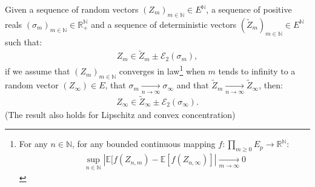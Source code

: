 \documentclass{ws-rmta}
\begin{document}
\begin{lemma}
  Given a sequence of random vectors $(Z_{m})_{m \in \mathbb N} \in E^{\mathbb N}$, a sequence of positive reals $(\sigma_{m})_{m \in \mathbb N} \in \mathbb R^{\mathbb N}_+$ and a sequence of deterministic vectors $(\tilde Z_{m})_{m \in \mathbb N} \in E^{\mathbb N}$ such that:%
  \begin{align*}
    Z_{m} \in \tilde Z_m \pm  \mathcal E_2(\sigma_{m}),
  \end{align*}
  if we assume that $(Z_{m})_{m \in \mathbb N}$ converges in 
  law\footnote{For any $n \in \mathbb N$, for any bounded continuous mapping $ f : \prod_{m\geq 0} E_p \to \mathbb R^{\mathbb N}$:
  \begin{align*}
     \sup_{n \in \mathbb N} \left\vert \mathbb E[f(Z_{n, m}) - \mathbb E[f(Z_{n, \infty})]\right\vert \underset{m\to \infty}{\longrightarrow} 0
   \end{align*} }
  when $m$ tends to infinity to a random vector $(Z_{\infty}) \in E$, that $\sigma_{m} \underset{n\to \infty}{\longrightarrow} \sigma_{\infty} $ and that $\tilde Z_{m} \underset{n\to \infty}{\longrightarrow} \tilde Z_{\infty}$, then:
  \begin{align*}
    Z_{\infty} \in \tilde Z_{\infty} \pm \mathcal E_2(\sigma_{\infty}).
  \end{align*}
  (The result also holds for Lipschitz and convex concentration)
\end{lemma}
\end{document}
